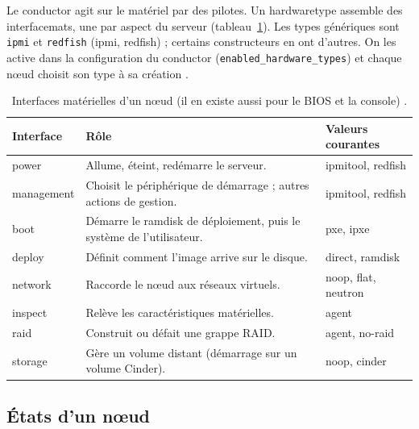Le conductor agit sur le matériel par des pilotes. Un \gls{hardwaretype} assemble des \glspl{interfacemat}, une par aspect
du serveur (tableau~\ref{tab:ir-interfaces}). Les types génériques sont \texttt{ipmi} et \texttt{redfish} (\gls{ipmi},
\gls{redfish}) ; certains constructeurs en ont d'autres. On les active dans la configuration du conductor
(\texttt{enabled\_\allowbreak hardware\_\allowbreak types}) et chaque nœud choisit son type à sa création
\parencite{ironic-drivers}.

\begin{table}[!ht]
\centering
\renewcommand{\arraystretch}{1.3}
\begin{tabular}{@{}>{\raggedright\arraybackslash\ttfamily\small}p{2.6cm}>{\raggedright\arraybackslash}p{8.4cm}>{\raggedright\arraybackslash\ttfamily\small}p{4.5cm}@{}}
\toprule
\textrm{\textbf{Interface}} & \textbf{Rôle} & \textrm{\textbf{Valeurs courantes}} \\
\midrule
power & Allume, éteint, redémarre le serveur. & ipmitool, redfish \\
management & Choisit le périphérique de démarrage ; autres actions de gestion. & ipmitool, redfish \\
boot & Démarre le ramdisk de déploiement, puis le système de l'utilisateur. & pxe, ipxe \\
deploy & Définit comment l'image arrive sur le disque. & direct, ramdisk \\
network & Raccorde le nœud aux réseaux virtuels. & noop, flat, neutron \\
inspect & Relève les caractéristiques matérielles. & agent \\
raid & Construit ou défait une grappe RAID. & agent, no-raid \\
storage & Gère un volume distant (démarrage sur un volume Cinder). & noop, cinder \\
\bottomrule
\end{tabular}
\caption{Interfaces matérielles d'un nœud (il en existe aussi pour le BIOS et la console) \parencite{ironic-drivers}.}
\label{tab:ir-interfaces}
\end{table}

\subsection{États d'un nœud}\label{sec:ir-etats}

